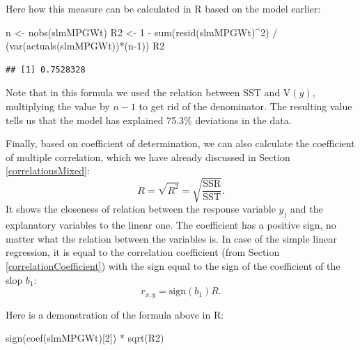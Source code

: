 \documentclass[
]{book}
\newenvironment{Shaded}{\begin{snugshade}}{\end{snugshade}}
\newcommand{\DecValTok}[1]{\textcolor[rgb]{0.00,0.00,0.81}{#1}}
\newcommand{\FunctionTok}[1]{\textcolor[rgb]{0.00,0.00,0.00}{#1}}
\newcommand{\NormalTok}[1]{#1}
\newcommand{\OtherTok}[1]{\textcolor[rgb]{0.56,0.35,0.01}{#1}}
\newcommand{\SpecialCharTok}[1]{\textcolor[rgb]{0.00,0.00,0.00}{#1}}
\theoremstyle{definition}
\theoremstyle{definition}
\theoremstyle{definition}
\theoremstyle{definition}
\theoremstyle{remark}
\begin{document}
Here how this measure can be calculated in R based on the model earlier:

\begin{Shaded}
\begin{Highlighting}[]
\NormalTok{n }\OtherTok{\textless{}{-}} \FunctionTok{nobs}\NormalTok{(slmMPGWt)}
\NormalTok{R2 }\OtherTok{\textless{}{-}} \DecValTok{1} \SpecialCharTok{{-}} \FunctionTok{sum}\NormalTok{(}\FunctionTok{resid}\NormalTok{(slmMPGWt)}\SpecialCharTok{\^{}}\DecValTok{2}\NormalTok{) }\SpecialCharTok{/}
\NormalTok{    (}\FunctionTok{var}\NormalTok{(}\FunctionTok{actuals}\NormalTok{(slmMPGWt))}\SpecialCharTok{*}\NormalTok{(n}\DecValTok{{-}1}\NormalTok{))}
\NormalTok{R2}
\end{Highlighting}
\end{Shaded}

\begin{verbatim}
## [1] 0.7528328
\end{verbatim}

Note that in this formula we used the relation between SST and V\((y)\), multiplying the value by \(n-1\) to get rid of the denominator. The resulting value tells us that the model has explained 75.3\% deviations in the data.

Finally, based on coefficient of determination, we can also calculate the coefficient of multiple correlation, which we have already discussed in Section \ref{correlationsMixed}:
\begin{equation}
    R = \sqrt{R^2} = \sqrt{\frac{\mathrm{SSR}}{\mathrm{SST}}} .
    \label{eq:multipleCorrelation}
\end{equation}
It shows the closeness of relation between the response variable \(y_j\) and the explanatory variables to the linear one. The coefficient has a positive sign, no matter what the relation between the variables is. In case of the simple linear regression, it is equal to the correlation coefficient (from Section \ref{correlationCoefficient}) with the sign equal to the sign of the coefficient of the slop \(b_1\):
\begin{equation}
    r_{x,y} = \mathrm{sign} (b_1) R .
    \label{eq:correlationInRegression}
\end{equation}

Here is a demonstration of the formula above in R:

\begin{Shaded}
\begin{Highlighting}[]
\FunctionTok{sign}\NormalTok{(}\FunctionTok{coef}\NormalTok{(slmMPGWt)[}\DecValTok{2}\NormalTok{]) }\SpecialCharTok{*} \FunctionTok{sqrt}\NormalTok{(R2)}
\end{Highlighting}
\end{Shaded}
\end{document}
